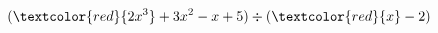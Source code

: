 \documentclass[preview]{standalone}
\begin{document}
\begin{align*}
(\textcolor{red}{2x^3} + 3x^2 - x + 5) \div (\textcolor{red}{x} - 2)
\end{align*}
\end{document}

